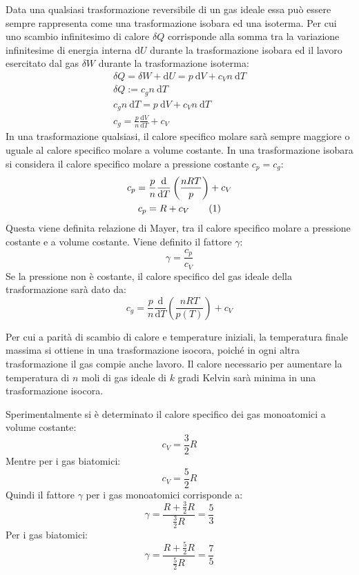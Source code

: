 \documentclass{article}
\newcommand{\df}{\mathrm{d}}
\numberwithin{equation}{subsection}
\begin{document}
Data una qualsiasi trasformazione reversibile di un gas ideale essa può essere sempre rappresenta come una trasformazione isobara ed una isoterma. Per cui uno scambio infinitesimo di calore $\delta Q$ 
corrisponde alla somma tra la variazione infinitesime di energia interna $\df U$ durante la trasformazione isobara ed il lavoro esercitato dal gas $\delta W$ durante la trasformazione isoterma: 
\begin{gather*}
    \delta Q=\delta W+\df U=p\:\df V+c_Vn\:\df T\\
    \delta Q :=c_gn\:\df T\\
    c_gn\:\df T=p\:\df V+c_Vn\:\df T\\
    c_g=\displaystyle\frac{p}{n}\frac{\df V}{\df T}+c_V
\end{gather*}
In una trasformazione qualsiasi, il calore specifico molare sarà sempre maggiore o uguale al calore specifico molare a volume costante. 
In una trasformazione isobara si considera il calore specifico molare a pressione costante $c_p=c_g$: 
\begin{gather*}
    c_p=\displaystyle\frac{p}{n}\frac{\df}{\df T}\left(\frac{nRT}{p}\right)+c_V\\
    c_p=R+c_V\tag{\stepcounter{equation}\theequation}
\end{gather*}
Questa viene definita relazione di Mayer, tra il 
calore specifico molare a pressione costante e a volume costante. Viene definito il fattore $\gamma$:
\begin{equation}
    \gamma=\displaystyle\frac{c_p}{c_V}
\end{equation}
Se la pressione non è costante, il calore specifico del gas 
ideale della trasformazione sarà dato da:
\begin{equation*}
    c_g=\displaystyle\frac{p}{n}\frac{\df}{\df T}\left(\frac{nRT}{p(T)}\right)+c_V
\end{equation*}

Per cui a parità di scambio di calore e temperature iniziali, la temperatura finale massima si ottiene in una trasformazione isocora, poiché in ogni altra trasformazione 
il gas compie anche lavoro. Il calore necessario per aumentare la temperatura di $n$ moli di gas ideale di $k$ gradi Kelvin sarà minima in una trasformazione isocora. 


Sperimentalmente si è determinato il calore 
specifico dei gas monoatomici a volume costante: 
\begin{equation}
    c_V=\displaystyle\frac{3}{2}R
\end{equation}
Mentre per i gas biatomici:
\begin{equation}
    c_V=\displaystyle\frac{5}{2}R
\end{equation}
Quindi il fattore $\gamma$ per i gas monoatomici 
corrisponde a: 
\begin{equation}
    \gamma=\displaystyle\frac{R+\frac{3}{2}R}{\frac{3}{2}R}=\frac{5}{3}
\end{equation}
Per i gas biatomici: 
\begin{equation}
    \gamma=\displaystyle\frac{R+\frac{5}{2}R}{\frac{5}{2}R}=\frac{7}{5}
\end{equation}
\end{document}
